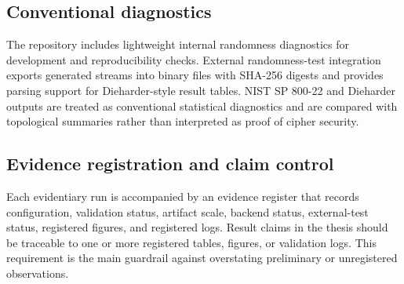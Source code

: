 \subsection{Conventional diagnostics}
\label{subsec:conventional-diagnostics}

The repository includes lightweight internal randomness diagnostics for development and reproducibility checks. External randomness-test integration exports generated streams into binary files with SHA-256 digests and provides parsing support for Dieharder-style result tables. NIST SP 800-22 and Dieharder outputs are treated as conventional statistical diagnostics and are compared with topological summaries rather than interpreted as proof of cipher security.

\subsection{Evidence registration and claim control}
\label{subsec:evidence-registration}

Each evidentiary run is accompanied by an evidence register that records configuration, validation status, artifact scale, backend status, external-test status, registered figures, and registered logs. Result claims in the thesis should be traceable to one or more registered tables, figures, or validation logs. This requirement is the main guardrail against overstating preliminary or unregistered observations.
